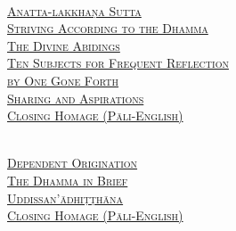 {  {\libertinusFont\selectfont\textbf{\textsc{\ifafiveversion\fontsize{18}{12}\fi\ifninebythirteenversion\fontsize{13}{8.5}\fi\ifbfiveversion\fontsize{22}{18}\fi\selectfont{}}}}\\
  \textsc{\ifafiveversion\fontsize{14.4}{28}\fi\ifninebythirteenversion\fontsize{8.7}{17}\fi\ifbfiveversion\fontsize{16}{33.5}\fi\selectfont
    \hyperref[anatta-lakkhana]{Anatta-lakkhaṇa Sutta} \ifdigitalversion\else\pageref{anatta-lakkhana}\fi\\
    \hyperref[striving-according-to-dhamma]{Striving According to the Dhamma} \ifdigitalversion\else\pageref{striving-according-to-dhamma}\fi\\
    \hyperref[divine-abidings]{The Divine Abidings} \ifdigitalversion\else\pageref{divine-abidings}\fi\\
    \hyperref[ten-reflections]{Ten Subjects for Frequent Reflection\\ \ifafiveversion\vspace{-0.4cm}\fi \ifninebythirteenversion\vspace{-0.2cm}\fi by One Gone Forth} \ifdigitalversion\else\pageref{ten-reflections}\fi\\
    \hyperref[sharing-aspirations]{Sharing and Aspirations} \ifdigitalversion\else\pageref{sharing-aspirations}\fi\\
    \hyperref[closing-homage]{Closing Homage (Pāli-English)} \ifdigitalversion\else\pageref{closing-homage}\fi\\
  }

  \clearpage

  {\libertinusFont\selectfont\textbf{\textsc{\ifafiveversion\fontsize{18}{12}\fi\ifninebythirteenversion\fontsize{13}{8.5}\fi\ifbfiveversion\fontsize{22}{18}\fi\selectfont{}}}}\\
  \textsc{\ifafiveversion\fontsize{14.4}{28}\fi\ifninebythirteenversion\fontsize{8.7}{17}\fi\ifbfiveversion\fontsize{16}{33.5}\fi\selectfont
    \hyperref[dependent-origination]{Dependent Origination} \ifdigitalversion\else\pageref{dependent-origination}\fi\\
    \hyperref[dhamma-in-brief]{The Dhamma in Brief} \ifdigitalversion\else\pageref{dhamma-in-brief}\fi\\
    \hyperref[uddissanadhitthana]{Uddissan'ādhiṭṭhāna} \ifdigitalversion\else\pageref{uddissanadhitthana}\fi\\
    \hyperref[closing-homage]{Closing Homage (Pāli-English)} \ifdigitalversion\else\pageref{closing-homage}\fi\\
  }

}
